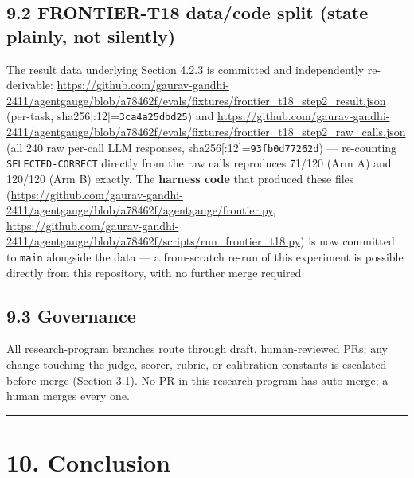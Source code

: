 \hypertarget{frontier-t18-datacode-split-state-plainly-not-silently}{%
\subsection{9.2 FRONTIER-T18 data/code split (state plainly, not
silently)}\label{frontier-t18-datacode-split-state-plainly-not-silently}}

The result data underlying Section 4.2.3 is committed and independently
re-derivable:
\url{https://github.com/gaurav-gandhi-2411/agentgauge/blob/a78462f/evals/fixtures/frontier_t18_step2_result.json}
(per-task, sha256{[}:12{]}=\texttt{3ca4a25dbd25}) and
\url{https://github.com/gaurav-gandhi-2411/agentgauge/blob/a78462f/evals/fixtures/frontier_t18_step2_raw_calls.json}
(all 240 raw per-call LLM responses, sha256{[}:12{]}=\texttt{93fb0d77262d}) ---
re-counting \texttt{SELECTED-CORRECT} directly from the raw calls
reproduces 71/120 (Arm A) and 120/120 (Arm B) exactly. The
\textbf{harness code} that produced these files
(\url{https://github.com/gaurav-gandhi-2411/agentgauge/blob/a78462f/agentgauge/frontier.py},
\url{https://github.com/gaurav-gandhi-2411/agentgauge/blob/a78462f/scripts/run_frontier_t18.py})
is now committed to \texttt{main}
alongside the data --- a from-scratch re-run of this experiment is
possible directly from this repository, with no further merge required.

\hypertarget{governance-1}{%
\subsection{9.3 Governance}\label{governance-1}}

All research-program branches route through draft, human-reviewed PRs;
any change touching the judge, scorer, rubric, or calibration constants
is escalated before merge (Section 3.1). No PR in this research program
has auto-merge; a human merges every one.

\begin{center}\rule{0.5\linewidth}{0.5pt}\end{center}

\hypertarget{conclusion-1}{%
\section{10. Conclusion}\label{conclusion-1}}

